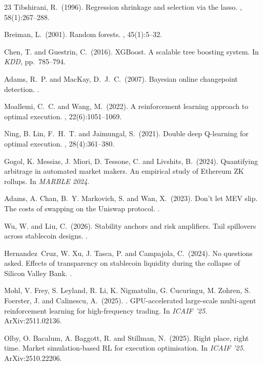 \documentclass[sigconf,anonymous,natbib=false]{acmart}
\begin{document}
\begin{thebibliography}{23}
Tibshirani, R.\ (1996).
\newblock Regression shrinkage and selection via the lasso.
, 58(1):267--288.

Breiman, L.\ (2001).
\newblock Random forests.
, 45(1):5--32.

Chen, T. and Guestrin, C.\ (2016).
\newblock XGBoost. A scalable tree boosting system.
\newblock In {\em KDD}, pp.~785--794.

Adams, R.~P. and MacKay, D.~J.~C.\ (2007).
\newblock Bayesian online changepoint detection.
.

Moallemi, C.~C. and Wang, M.\ (2022).
\newblock A reinforcement learning approach to optimal execution.
, 22(6):1051--1069.

Ning, B. Lin, F.~H.~T. and Jaimungal, S.\ (2021).
\newblock Double deep Q-learning for optimal execution.
, 28(4):361--380.

Gogol, K. Messias, J. Miori, D. Tessone, C. and Livshits, B.\ (2024).
\newblock Quantifying arbitrage in automated market makers. An empirical study
  of {Ethereum} {ZK} rollups.
\newblock In {\em MARBLE 2024}.

Adams, A. Chan, B.~Y. Markovich, S. and Wan, X.\ (2023).
\newblock Don't let {MEV} slip. The costs of swapping on the {Uniswap}
  protocol.
.

Wu, W. and Liu, C.\ (2026).
\newblock Stability anchors and risk amplifiers. Tail spillovers across
  stablecoin designs.
.

Hernandez~Cruz, W. Xu, J. Tasca, P. and Campajola, C.\ (2024).
\newblock No questions asked. Effects of transparency on stablecoin liquidity
  during the collapse of {Silicon Valley Bank}.
.

Mohl, V. Frey, S. Leyland, R. Li, K. Nigmatulin, G. Cucuringu, M.
  Zohren, S. Foerster, J. and Calinescu, A.\ (2025).
. {GPU}-accelerated large-scale multi-agent
  reinforcement learning for high-frequency trading.
\newblock In {\em ICAIF '25}. ArXiv:2511.02136.

Olby, O. Bacalum, A. Baggott, R. and Stillman, N.\ (2025).
\newblock Right place, right time. Market simulation-based {RL} for execution
  optimisation.
\newblock In {\em ICAIF '25}. ArXiv:2510.22206.

\end{thebibliography}
\end{document}
